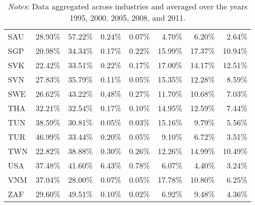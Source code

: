 \documentclass[a4paper,11pt]{article}
\begin{document}
\begin{table}[h]
\begin{tabular}{lrrrrrrr}
    SAU   & 28.93\% & 57.22\% & 0.24\% & 0.07\% & 4.70\% & 6.20\% & 2.64\% \\
    SGP   & 20.98\% & 34.34\% & 0.17\% & 0.22\% & 15.99\% & 17.37\% & 10.94\% \\
    SVK   & 22.42\% & 33.51\% & 0.22\% & 0.17\% & 17.00\% & 14.17\% & 12.51\% \\
    SVN   & 27.83\% & 35.79\% & 0.11\% & 0.05\% & 15.35\% & 12.28\% & 8.59\% \\
    SWE   & 26.62\% & 43.22\% & 0.48\% & 0.27\% & 11.70\% & 10.68\% & 7.03\% \\
    THA   & 32.21\% & 32.54\% & 0.17\% & 0.10\% & 14.95\% & 12.59\% & 7.44\% \\
    TUN   & 38.59\% & 30.81\% & 0.05\% & 0.03\% & 15.16\% & 9.79\% & 5.56\% \\
    TUR   & 46.99\% & 33.44\% & 0.20\% & 0.05\% & 9.10\% & 6.72\% & 3.51\% \\
    TWN   & 22.82\% & 38.88\% & 0.30\% & 0.26\% & 12.26\% & 14.99\% & 10.49\% \\
    USA   & 37.48\% & 41.60\% & 6.43\% & 0.78\% & 6.07\% & 4.40\% & 3.24\% \\
    VNM   & 37.04\% & 28.00\% & 0.07\% & 0.05\% & 17.78\% & 10.80\% & 6.25\% \\
    ZAF   & 29.60\% & 49.51\% & 0.10\% & 0.02\% & 6.92\% & 9.48\% & 4.36\% \\
\bottomrule
 \end{tabular}
          \caption*{\textit{Notes}: Data aggregated across industries and averaged over the years 1995, 2000, 2005, 2008, and 2011.}
\end{table}
\end{document}
